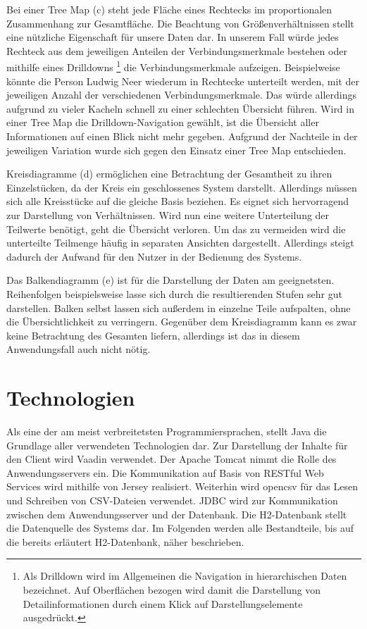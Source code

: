 Bei einer Tree Map (c) steht jede Fläche eines Rechtecks im proportionalen Zusammenhang zur Gesamtfläche. Die Beachtung von Größenverhältnissen stellt eine nützliche Eigenschaft für unsere Daten dar. In unserem Fall würde jedes Rechteck aus dem jeweiligen Anteilen der Verbindungsmerkmale bestehen oder mithilfe eines Drilldowns
\footnote{Als Drilldown wird im Allgemeinen die Navigation in hierarchischen Daten bezeichnet. Auf Oberflächen bezogen wird damit die Darstellung von Detailinformationen durch einem Klick auf Darstellungselemente ausgedrückt.}
 die Verbindungsmerkmale aufzeigen. Beispielweise könnte die Person Ludwig Neer wiederum in Rechtecke unterteilt werden, mit der jeweiligen Anzahl der verschiedenen Verbindungsmerkmale. Das würde allerdings aufgrund zu vieler Kacheln schnell zu einer schlechten Übersicht führen. Wird in einer Tree Map die Drilldown-Navigation gewählt, ist die Übersicht aller Informationen auf einen Blick nicht mehr gegeben. Aufgrund der Nachteile in der jeweiligen Variation wurde sich gegen den Einsatz einer Tree Map entschieden.

Kreisdiagramme (d) ermöglichen eine Betrachtung der Gesamtheit zu ihren Einzelstücken, da der Kreis ein geschlossenes System darstellt. Allerdings müssen sich alle Kreisstücke auf die gleiche Basis beziehen. Es eignet sich hervorragend zur Darstellung von Verhältnissen. Wird nun eine weitere Unterteilung der Teilwerte benötigt, geht die Übersicht verloren. Um das zu vermeiden wird die unterteilte Teilmenge häufig in separaten Ansichten dargestellt. Allerdings steigt dadurch der Aufwand für den Nutzer in der Bedienung des Systems. 

Das Balkendiagramm (e) ist für die Darstellung der Daten am geeignetsten. Reihenfolgen beispielsweise lasse sich durch die resultierenden Stufen sehr gut darstellen. Balken selbst lassen sich außerdem in einzelne Teile aufspalten, ohne die Übersichtlichkeit zu verringern. Gegenüber dem Kreisdiagramm kann es zwar keine Betrachtung des Gesamten liefern, allerdings ist das in diesem Anwendungsfall auch nicht nötig. 

\section{Technologien}

Als eine der am meist verbreitetsten Programmiersprachen, stellt Java die Grundlage aller verwendeten Technologien dar. Zur Darstellung der Inhalte für den Client wird Vaadin verwendet. Der Apache Tomcat nimmt die Rolle des Anwendungsservers ein. Die Kommunikation auf Basis von RESTful Web Services wird mithilfe von Jersey realisiert. Weiterhin wird opencsv für das Lesen und Schreiben von CSV-Dateien verwendet. JDBC wird zur Kommunikation zwischen dem Anwendungsserver und der Datenbank. Die H2-Datenbank stellt die Datenquelle des Systems dar. Im Folgenden werden alle Bestandteile, bis auf die bereits erläutert H2-Datenbank, näher beschrieben. 

